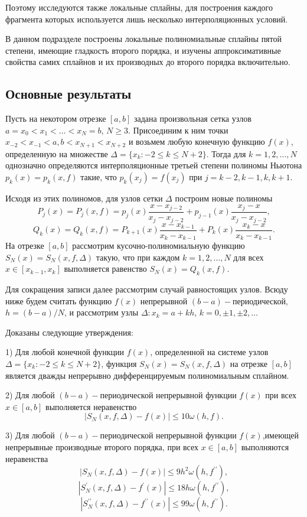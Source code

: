 Поэтому исследуются также локальные сплайны, для построения каждого фрагмента
которых используется лишь несколько интерполяционных условий.

В данном подразделе построены локальные полиномиальные сплайны пятой степени,
имеющие гладкость второго порядка, и изучены аппроксимативные свойства самих
сплайнов и их производных до второго порядка включительно.


\subsection{Основные результаты}

Пусть на некотором отрезке $[a,b]$ задана произвольная сетка узлов
$a=x_0<x_1<\dots <x_N=b$,  $N\geqslant 3$. Присоединим к ним точки
$ x_{-2}<x_{-1}<a, b<x_{N+1}<x_{N+2}$ и возьмем любую конечную функцию $f(x)$,
определенную на множестве $\Delta=\{x_k: -2\leqslant k \leqslant N+2\}$.
Тогда для $k=1,2,\dots,N$ однозначно определяются интерполяционные третьей степени
 полиномы Ньютона $p_k (x)=p_k (x,f)$
такие, что  $p_k (x_j )=f(x_j)$ при $j=k-2,k-1,k,k+1$.

Исходя из этих полиномов, для узлов сетки $\Delta$ построим новые полиномы
$$
P_j (x)=P_j (x,f)=p_j (x) \frac{x-x_{j-2}}{x_j-x_{j-2}}+
p_{j-1}(x)\frac{x_j-x}{x_j-x_{j-2}},
$$
$$
Q_k (x)=Q_k (x,f)=P_{k+1}(x)\frac{x-x_{k-1}}{x_k-x_{k-1}}+
P_k (x)\frac{x_k-x}{x_k-x_{k-1}}.
$$
На отрезке $[a,b]$  рассмотрим кусочно-полиномиальную функцию
 $S_N (x)=S_N (x,f,\Delta)$ такую, что при каждом $k=1,2,\dots,N$
для всех $x\in [x_{k-1},x_k]$ выполняется равенство $S_N (x)=Q_k (x,f)$.

Для сокращения записи далее рассмотрим случай равностоящих узлов.
Всюду ниже будем считать функцию $f(x)$ непрерывной $(b-a)-$периодической,
$h=(b-a)/N$, и рассмотрим узлы $\Delta:x_k=a+kh$, $k=0,\pm 1,\pm 2,\dots$

Доказаны следующие утверждения:

1) Для любой конечной функции $f(x)$, определенной на системе узлов
$\Delta=\{x_k:-2\leqslant k \leqslant N+2\}$, функция
$S_N (x)=S_N (x,f,\Delta)$ на отрезке $[a,b]$
является дважды непрерывно дифференцируемым полиномиальным сплайном.

2) Для любой $(b-a)-$периодической непрерывной функции $f(x)$
при всех $x\in [a,b]$ выполняется неравенство
$$
|S_N (x,f,\Delta)-f(x)|\leqslant 10 \omega(h,f).
$$

3) Для любой $(b-a)-$периодической непрерывной функции $f(x)$,имеющей
непрерывные производные второго порядка, при всех $x\in [a,b]$ выполняются
неравенства
$$
|S_N (x,f,\Delta)-f(x)|\leqslant 9h^2 \omega(h,f^{\prime\prime}),
$$
$$
|S_N^\prime(x,f,\Delta)-f^\prime(x)|\leqslant 18h\omega(h,f^{\prime\prime}),
$$
$$
|S_N^{\prime\prime}(x,f,\Delta)-f^{\prime\prime}(x)|\leqslant 99\omega(h,f^{\prime\prime}).
$$


